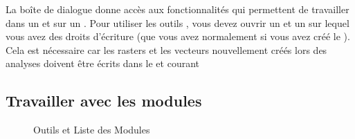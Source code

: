 {%

La boîte de dialogue  donne accès aux fonctionnalités \grass qui permettent de travailler dans un  et sur un . Pour utiliser les outils \grass, vous devez ouvrir un  et un  sur lequel vous avez des droits d'écriture (que vous avez normalement si vous avez créé le ). Cela est nécessaire car les rasters et les vecteurs nouvellement créés lors des analyses doivent être écrits dans le  et  courant

\subsection{Travailler avec les modules \grass}\label{grass_modules}
\begin{figure}[ht]
\centering
   \hspace{0.5cm}
\caption{Outils \grass et Liste des Modules \nixcaption}\label{fig:grass_modules}
\end{figure}

}
